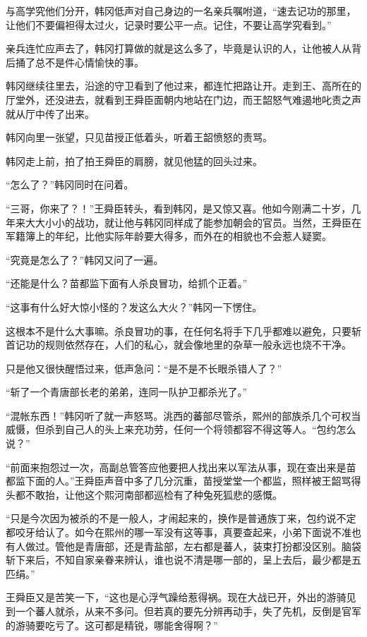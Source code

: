 与高学究他们分开，韩冈低声对自己身边的一名亲兵嘱咐道，“速去记功的那里，让他们不要偏袒得太过火，记录时要公平一点。记住，不要让高学究看到。”

亲兵连忙应声去了，韩冈打算做的就是这么多了，毕竟是认识的人，让他被人从背后捅了总不是件心情愉快的事。

韩冈继续往里去，沿途的守卫看到了他过来，都连忙把路让开。走到王、高所在的厅堂外，还没进去，就看到王舜臣面朝内地站在门边，而王韶怒气难遏地叱责之声就从厅中传了出来。

韩冈向里一张望，只见苗授正低着头，听着王韶愤怒的责骂。

韩冈走上前，拍了拍王舜臣的肩膀，就见他猛的回头过来。

“怎么了？”韩冈同时在问着。

“三哥，你来了？！”王舜臣转头，看到韩冈，是又惊又喜。他如今刚满二十岁，几年来大大小小的战功，就让他与韩冈同样成了能参加朝会的官员。当然，王舜臣在军籍簿上的年纪，比他实际年龄要大得多，而外在的相貌也不会惹人疑窦。

“究竟是怎么了？”韩冈又问了一遍。

“还能是什么？苗都监下面有人杀良冒功，给抓个正着。”

“这事有什么好大惊小怪的？发这么大火？”韩冈一下愣住。

这根本不是什么大事嘛。杀良冒功的事，在任何名将手下几乎都难以避免，只要斩首记功的规则依然存在，人们的私心，就会像地里的杂草一般永远也烧不干净。

只是他又很快醒悟过来，低声急问：“是不是不长眼杀错人了？”

“斩了一个青唐部长老的弟弟，连同一队护卫都杀光了。”

“混帐东西！”韩冈听了就一声怒骂。洮西的蕃部尽管杀，熙州的部族杀几个可权当威慑，但杀到自己人的头上来充功劳，任何一个将领都容不得这等人。“包约怎么说？”

“前面来抱怨过一次，高副总管答应他要把人找出来以军法从事，现在查出来是苗都监下面的人。”王舜臣声音中多了几分沉重，苗授堂堂一个都监，照样被王韶骂得头都不敢抬，让他这个熙河南部都巡检有了种兔死狐悲的感慨。

“只是今次因为被杀的不是一般人，才闹起来的，换作是普通族丁来，包约说不定都咬牙给认了。如今在熙州的哪一军没有这等事，真要查起来，小弟下面说不准也有人做过。管他是青唐部，还是青盐部，左右都是蕃人，装束打扮都没区别。脑袋斩下来后，不知自家亲眷来辨认，谁也说不清是哪一部的，呈上去后，最少都是五匹绢。”

王舜臣又是苦笑一下，“这也是心浮气躁给惹得祸。现在大战已开，外出的游骑见到一个蕃人就杀，从来不多问。但若真的要先分辨再动手，失了先机，反倒是官军的游骑要吃亏了。这可都是精锐，哪能舍得啊？”

